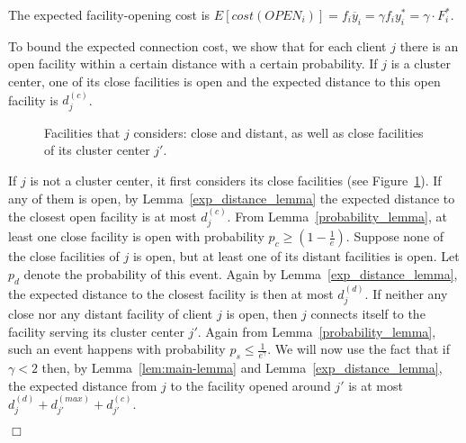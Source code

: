 \documentclass[11pt]{article}
\newcommand{\qed}{\nopagebreak \hfill $\Box$}
\newenvironment{proof}{\par \noindent {\em Proof:}}{\qed \par}
\begin{document}
\begin{proof}
The expected facility-opening cost is 
$E[cost(OPEN_i)] = f_i \overline{y}_i = \gamma  f_i y_i^* = 
\gamma \cdot F^*_i$. 

To bound the expected connection cost, we show that for each client $j$ there is an open facility
within a certain distance with a certain probability.
If $j$ is a cluster center, one of its close facilities is open and the expected distance
to this open facility is $d_j^{(c)}$.

\begin{figure}[t]
\begin{center}
\end{center}
\caption{Facilities that $j$ considers: close and distant, as well as close
facilities of its cluster center $j'$.}
\label{fig:routing}
\end{figure}

If $j$ is not a cluster center, it first considers its close facilities (see Figure~\ref{fig:routing}).
If any of them is open, by Lemma~\ref{exp_distance_lemma} the expected distance to the closest open facility is at most $d_j^{(c)}$.
From Lemma~\ref{probability_lemma}, at least one close facility is open with probability $p_c \geq (1-\frac{1}{e})$.
Suppose none of the close facilities of $j$ is open, but at least one of its distant facilities is open.
Let $p_d$ denote the probability of this event. Again by Lemma~\ref{exp_distance_lemma}, the expected distance to the closest facility is then at most $d_j^{(d)}$.
If neither any close nor any distant facility of client $j$ is open,
then $j$ connects itself to the facility serving its cluster center $j'$.
Again from Lemma~\ref{probability_lemma}, such an event happens with probability $p_s \leq \frac{1}{e^\gamma}$.
We will now use the fact that if $\gamma < 2$ then, by Lemma~\ref{lem:main-lemma} and Lemma~\ref{exp_distance_lemma},
the expected distance from $j$ to the facility opened around $j'$ is at most
$d_{j}^{(d)} + d_{j'}^{(max)} + d_{j'}^{(c)}$.


\end{proof}
\end{document}
